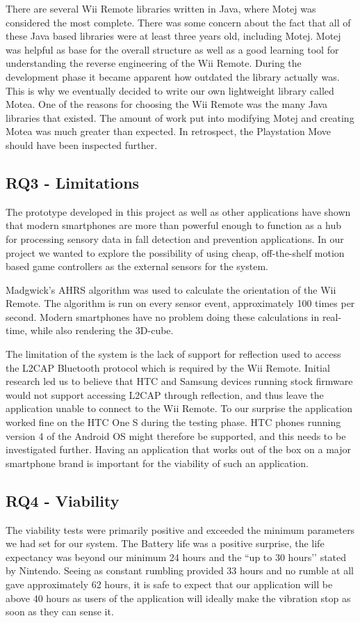 There are several Wii Remote libraries written in Java, where Motej was considered the most complete. There was some concern about the fact that all of these Java based libraries were at least three years old, including Motej. Motej was helpful as base for the overall structure as well as a good learning tool for understanding the reverse engineering of the Wii Remote. During the development phase it became apparent how outdated the library actually was. This is why we eventually decided to write our own lightweight library called Motea. One of the reasons for choosing the Wii Remote was the many Java libraries that existed. The amount of work put into modifying Motej and creating Motea was much greater than expected. In retrospect, the Playstation Move should have been inspected further.

\subsection{RQ3 - Limitations}
The prototype developed in this project as well as other applications \cite{iFall, semiSupervisedFallDetection, mobilePhoneBasedFallDetection, detectionOfFalls} have shown that modern smartphones are more than powerful enough to function as a hub for processing sensory data in fall detection and prevention applications. In our project we wanted to explore the possibility of using cheap, off-the-shelf motion based game controllers as the external sensors for the system. 

Madgwick’s AHRS algorithm was used to calculate the orientation of the Wii Remote. The algorithm is run on every sensor event, approximately 100 times per second. Modern smartphones have no problem doing these calculations in real-time, while also rendering the 3D-cube. 

The limitation of the system is the lack of support for reflection used to access the L2CAP Bluetooth protocol which is required by the Wii Remote. Initial research led us to believe that HTC and Samsung devices running stock firmware would not support accessing L2CAP through reflection, and thus leave the application unable to connect to the Wii Remote. To our surprise the application worked fine on the HTC One S during the testing phase. HTC phones running version 4 of the Android OS might therefore be supported, and this needs to be investigated further. Having an application that works out of the box on a major smartphone brand is important for the viability of such an application.

\subsection{RQ4 - Viability}
The viability tests were primarily positive and exceeded the minimum parameters we had set for our system. The Battery life was a positive surprise, the life expectancy was beyond our minimum 24 hours and the ``up to 30 hours’’ stated by Nintendo. Seeing as constant rumbling provided 33 hours and no rumble at all gave approximately 62 hours, it is safe to expect that our application will be above 40 hours as users of the application will ideally make the vibration stop as soon as they can sense it. 

